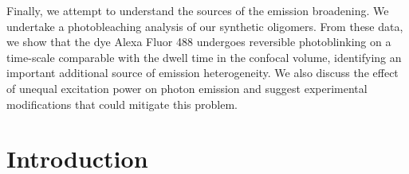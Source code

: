 Finally, we attempt to understand the sources of the emission broadening. We undertake a photobleaching analysis of our synthetic oligomers. From these data, we show that the dye Alexa Fluor 488 undergoes reversible photoblinking on a time-scale comparable with the dwell time in the confocal volume, identifying an important additional source of emission heterogeneity. We also discuss the effect of unequal excitation power on photon emission and suggest experimental modifications that could mitigate this problem. 

%



\section{Introduction}
